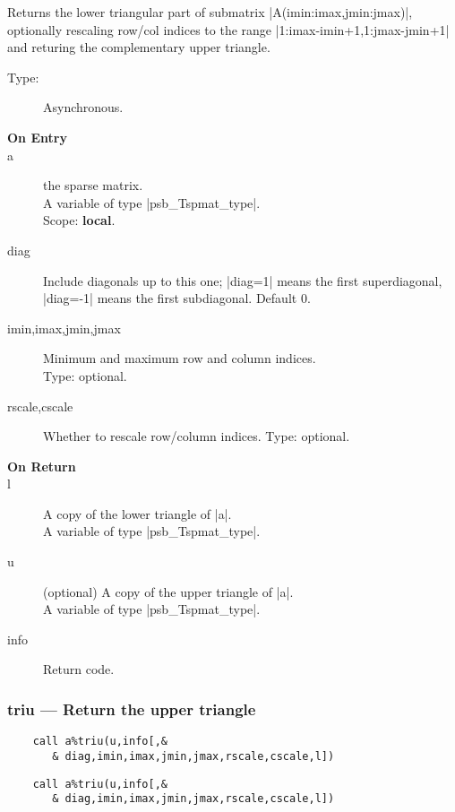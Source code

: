 Returns the lower triangular part of submatrix
\fortinline|A(imin:imax,jmin:jmax)|, optionally rescaling row/col indices to
the range \fortinline|1:imax-imin+1,1:jmax-jmin+1| and returing the
complementary upper triangle. 
\begin{description}
\item[Type:] Asynchronous.
\item[\bf On Entry]
\item[a] the sparse matrix.\\
A variable of type \fortinline|psb_Tspmat_type|.\\
Scope: {\bf local}.\\
\item[diag] Include diagonals up to this one; \fortinline|diag=1| means the
  first superdiagonal, \fortinline|diag=-1| means the first subdiagonal. 
Default 0.
\item[imin,imax,jmin,jmax] Minimum and maximum row and column indices.\\
Type: optional.
\item[rscale,cscale] Whether to rescale row/column indices.
Type: optional.
\end{description}
\begin{description}
\item[\bf On Return]
\item[l] A copy  of the lower triangle of \fortinline|a|.\\
A variable of type \fortinline|psb_Tspmat_type|.
\item[u] (optional) A copy  of the upper triangle of \fortinline|a|.\\
A variable of type \fortinline|psb_Tspmat_type|.
\item[info] Return code. 
\end{description}

\subsubsection{triu --- Return the upper triangle}
\ifpdf
\begin{verbatim}
    call a%triu(u,info[,&
       & diag,imin,imax,jmin,jmax,rscale,cscale,l])
\end{verbatim}
\else
\begin{verbatim}
    call a%triu(u,info[,&
       & diag,imin,imax,jmin,jmax,rscale,cscale,l])
\end{verbatim}
\fi

